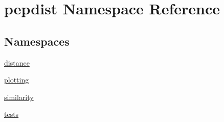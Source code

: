 \hypertarget{namespacepepdist}{}\section{pepdist Namespace Reference}
\label{namespacepepdist}
\subsection*{Namespaces}
\begin{DoxyCompactItemize}
\item 
 \mbox{\hyperlink{namespacepepdist_1_1distance}{distance}}
\item 
 \mbox{\hyperlink{namespacepepdist_1_1plotting}{plotting}}
\item 
 \mbox{\hyperlink{namespacepepdist_1_1similarity}{similarity}}
\item 
 \mbox{\hyperlink{namespacepepdist_1_1tests}{tests}}
\end{DoxyCompactItemize}
